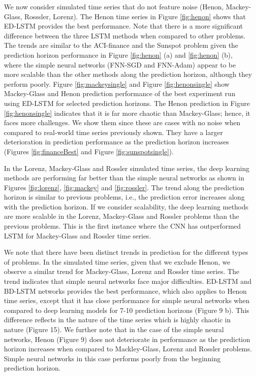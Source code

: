 \documentclass{ieeeaccess}
\begin{document}
We now consider simulated time series that do not feature noise (Henon, Mackey-Glass, Rosssler, Lorenz). The Henon time series in  Figure \ref{fig:henon}  shows that ED-LSTM provides the best performance. Note that there is a more significant difference between the three LSTM methods   when compared to other problems. The trends are similar to the ACI-finance  and the Sunspot problem  given the prediction horizon performance in Figure \ref{fig:henon} (a) and \ref{fig:henon} (b), where the simple neural networks (FNN-SGD and FNN-Adam) appear to be more scalable than the other methods along the prediction horizon, although they perform poorly.  Figure \ref{fig:mackeysingle}  and Figure \ref{fig:henonsingle} show Mackey-Glass and Henon prediction  performance of the best experiment run using ED-LSTM for selected prediction horizons. The Henon prediction in Figure \ref{fig:henonsingle}  indicates that it is far more  chaotic than Mackey-Glass; hence, it  faces more challenges. We show them since these are cases with no noise when compared to real-world time series previously shown. They have a larger   deterioration in prediction performance as the prediction horizon increases (Figures \ref{fig:financeBest} and Figure \ref{fig:sunspotsingle}). 

In the Lorenz, Mackey-Glass and Rossler simulated time series, the deep learning methods are performing far better than the simple neural networks as shown in Figures \ref{fig:lorenz}, \ref{fig:mackey} and \ref{fig:rossler}. The trend along the prediction horizon is similar to previous problems, i.e., the prediction error increases along with the prediction horizon. If we consider scalability, the deep learning  methods are more scalable in the Lorenz, Mackey-Glass and Rossler problems than the previous problems.   This is the first instance where the CNN has outperformed LSTM for Mackey-Glass and Rossler time series. 
  



 We note that there have been distinct trends in prediction for the different types of problems. In the simulated time series, given that we exclude Henon,  we observe a similar trend for Mackey-Glass, Lorenz and Rossler time series. The trend indicates  that simple neural networks face major difficulties.   ED-LSTM and BD-LSTM networks provides the best performance, which also applies to Henon time series, except that it has close performance for simple neural networks when compared to deep learning models for 7-10  prediction horizons (Figure 9 b). This difference  reflects in the nature of the time series which is  highly chaotic in nature (Figure 15). We further note that in the case of the simple neural networks,   Henon   (Figure 9) does not   deteriorate in performance as the prediction horizon increases when compared to Mackley-Glass, Lorenz and Rossler problems. Simple neural networks in this case performs poorly from the beginning prediction horizon.  
 
\end{document}
